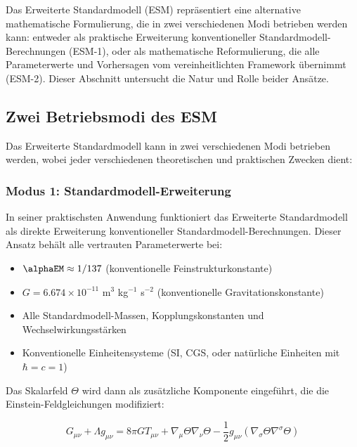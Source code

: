 	Das Erweiterte Standardmodell (ESM) repräsentiert eine alternative mathematische Formulierung, die in zwei verschiedenen Modi betrieben werden kann: entweder als praktische Erweiterung konventioneller Standardmodell-Berechnungen (ESM-1), oder als mathematische Reformulierung, die alle Parameterwerte und Vorhersagen vom vereinheitlichten Framework übernimmt (ESM-2). Dieser Abschnitt untersucht die Natur und Rolle beider Ansätze.
	
	\subsection{Zwei Betriebsmodi des ESM}
	\label{subsec:two_operational_modes}
	
	Das Erweiterte Standardmodell kann in zwei verschiedenen Modi betrieben werden, wobei jeder verschiedenen theoretischen und praktischen Zwecken dient:
	
	\subsubsection{Modus 1: Standardmodell-Erweiterung}
	\label{subsubsec:mode1_sm_extension}
	
	In seiner praktischsten Anwendung funktioniert das Erweiterte Standardmodell als direkte Erweiterung konventioneller Standardmodell-Berechnungen. Dieser Ansatz behält alle vertrauten Parameterwerte bei:
	
	\begin{itemize}
		\item $\alphaEM \approx 1/137$ (konventionelle Feinstrukturkonstante)
		\item $G = 6.674 \times 10^{-11}$ m$^3$ kg$^{-1}$ s$^{-2}$ (konventionelle Gravitationskonstante)
		\item Alle Standardmodell-Massen, Kopplungskonstanten und Wechselwirkungsstärken
		\item Konventionelle Einheitensysteme (SI, CGS, oder natürliche Einheiten mit $\hbar = c = 1$)
	\end{itemize}
	
	Das Skalarfeld $\Theta$ wird dann als zusätzliche Komponente eingeführt, die die Einstein-Feldgleichungen modifiziert:
	
	\begin{equation}
		G_{\mu\nu} + \Lambda g_{\mu\nu} = 8\pi G T_{\mu\nu} + \nabla_{\mu}\Theta\nabla_{\nu}\Theta - \frac{1}{2}g_{\mu\nu}(\nabla_{\sigma}\Theta\nabla^{\sigma}\Theta)
	\end{equation}
	
